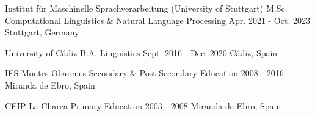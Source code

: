 

\begin{cventries}

  \cventry 
    {Institut für Maschinelle Sprachverarbeitung (University of Stuttgart)} %
    {M.Sc. Computational Linguistics \& Natural Language Processing} %
    {Apr. 2021 - Oct. 2023} %
    {Stuttgart, Germany} %
    {
    }

  \cventry
    {University of Cádiz} %
    {B.A. Linguistics} %
    {Sept. 2016 - Dec. 2020} %
    {Cádiz, Spain} %
    {
    }

  \cventry
    {IES Montes Obarenes}
    {Secondary \& Post-Secondary Education}
    {2008 - 2016}
    {Miranda de Ebro, Spain}
    {}

  \cventry
    {CEIP La Charca}
    {Primary Education}
    {2003 - 2008}
    {Miranda de Ebro, Spain}
    {}


\end{cventries}
